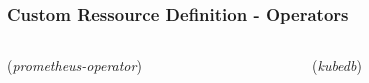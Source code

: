 \documentclass{beamer}
\begin{document}
\begin{frame}
  \frametitle{Custom Ressource Definition - Operators}
  \begin{columns}
  \begin{column}{0.55\textwidth}
    (\textit{prometheus-operator})
    \inputminted[fontsize=\tiny,frame=single]{yaml}{resources/service-monitor.yaml}
  \end{column}
  \begin{column}{0.4\textwidth}
    (\textit{kubedb})
    \inputminted[fontsize=\tiny,frame=single]{yaml}{resources/kubedb.yaml}
  \end{column}
  \end{columns}
\end{frame}
\end{document}
